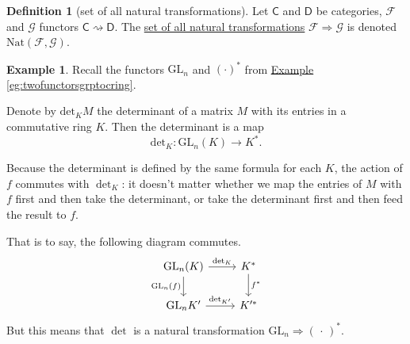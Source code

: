 \documentclass[a4paper]{report}
\newcommand{\defn}[1]{\ul{#1}}
\newcommand{\GL}{\mathrm{GL}}
\newcommand{\Nat}{\mathrm{Nat}}
\theoremstyle{definition}
\newtheorem{definition}{Definition}[section]
\newtheorem{example}{Example}[section]
\theoremstyle{plain}
\theoremstyle{remark}
\begin{document}
\begin{definition}[set of all natural transformations]
  \label{def:setofallnaturaltransformations}
  Let $\mathsf{C}$ and $\mathsf{D}$ be categories, $\mathcal{F}$ and $\mathcal{G}$ functors $\mathsf{C} \rightsquigarrow \mathsf{D}$. The \defn{set of all natural transformations} $\mathcal{F} \Rightarrow \mathcal{G}$ is denoted $\Nat(\mathcal{F}, \mathcal{G})$.
\end{definition} 

\begin{example}
  Recall the functors $\mathrm{GL}_{n}$ and $(\cdot)^{*}$ from \hyperref[eg:twofunctorsgrptocring]{Example \ref*{eg:twofunctorsgrptocring}}.

  Denote by $\mathrm{det}_{K}M$ the determinant of a matrix $M$ with its entries in a commutative ring $K$. Then the determinant is a map
  \begin{equation*}
    \mathrm{det}_{K}\colon \GL_{n}(K) \to K^{*}.
  \end{equation*}

  Because the determinant is defined by the same formula for each $K$, the action of $f$ commutes with $\det_{K}$: it doesn't matter whether we map the entries of $M$ with $f$ first and then take the determinant, or take the determinant first and then feed the result to $f$.

  That is to say, the following diagram commutes.
  \begin{equation*}
    \begin{tikzcd}
      \GL_{n}(K)
      \arrow[r, "\det_{K}"]
      \arrow[d, swap, "\GL_{n}(f)"]
      & K^{*}
      \arrow[d, "f^{*}"]
      \\
      \GL_{n}K'
      \arrow[r, "\det_{K'}"]
      & K'^{*}
    \end{tikzcd}
  \end{equation*}
  But this means that $\det$ is a natural transformation $\GL_{n} \Rightarrow \mathrm{(\,\cdot\,)^{*}}$.
\end{example}
\end{document}
